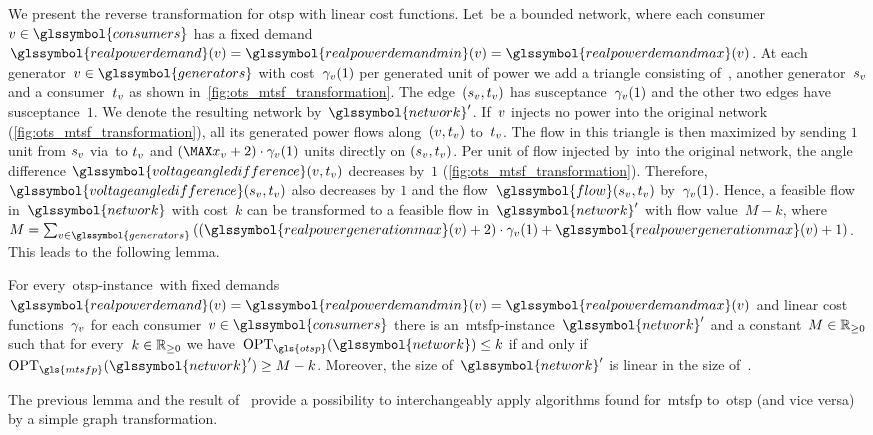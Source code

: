 We present the reverse transformation for
\gls{otsp} with linear cost functions. Let~\dcnetworktuple be a bounded
network, where each consumer~$\vertex\in\glssymbol{consumers}$ has a fixed
demand~$\glssymbol{realpowerdemand}(\vertex) =
\glssymbol{realpowerdemandmin}(\vertex) =
\glssymbol{realpowerdemandmax}(\vertex)$. At each
generator~$\vertex\in\glssymbol{generators}$ with cost~$\gamma_{v}(1)$ per
generated unit of power we add a triangle consisting of~\vertex, another
generator~$s_{v}$ and a consumer~$t_{v}$ as shown
in~\cref{fig:ots_mtsf_transformation}. The
edge~$(s_v,t_v)$ has susceptance~$\gamma_{v}(1)$ and
the other two edges have susceptance~$1$. We denote the resulting network
by~$\glssymbol{network}'$.
%
If~$v$ injects no power into the original network
(\cref{fig:ots_mtsf_transformation}), all its generated power flows
along~$(v, t_v)$ to~$t_v$. The flow in this triangle
is then maximized by sending $1$ unit from $s_{v}$ via~\vertex to
$t_v$ and $(\maxexcess_\vertex+2)\cdot\cost_{\vertex}(1)$ units
directly on $(s_v, t_v)$. Per unit of flow injected
by~\vertex into the original network, the angle difference
$\glssymbol{voltageangledifference}(\vertex, \sink_{\vertex})$ decreases by~$1$
(\cref{fig:ots_mtsf_transformation}). Therefore,
$\glssymbol{voltageangledifference}(\source_\vertex, \sink_\vertex)$ also
decreases by $1$ and the flow~$\glssymbol{flow}(\source_\vertex,
\sink_{\vertex})$ by~$\gamma_v(1)$. Hence, a feasible flow
in~$\glssymbol{network}$ with cost~$k$ can be transformed to a feasible flow
in~$\glssymbol{network}'$ with flow value~$M-k$, where~$
M
=
\sum_{\vertex\in\glssymbol{generators}}
\left((\glssymbol{realpowergenerationmax}(\vertex)+2)\cdot\cost_\vertex(1)
+
\glssymbol{realpowergenerationmax}(\vertex) + 1\right)
% 
$. This leads to the following lemma.
% 
\begin{lemma}
    \label{lem:ots_msf_transformation}
    For every~\gls{otsp}-instance~\dcnetworktuple with fixed
    demands~$\glssymbol{realpowerdemand}(\vertex) =
    \glssymbol{realpowerdemandmin}(\vertex) =
    \glssymbol{realpowerdemandmax}(\vertex)$ and linear cost
    functions~$\gamma_{v}$ for each
    consumer~$\vertex\in\glssymbol{consumers}$ there is
    an~\gls{mtsfp}-instance~$\glssymbol{network}'$ and a
    constant~$M\in\mathbb{R}_{\ge0}$ such that for every~$k\in\mathbb{R}_{\ge0}$ we
    have~$\opt_{\gls{otsp}}(\glssymbol{network})\le k$ if and only
    if~$\opt_{\gls{mtsfp}}(\glssymbol{network}')\ge M-k$. Moreover, the size
    of~$\glssymbol{network}'$ is linear in the size of~.
% 
\end{lemma}
% 
The previous lemma and the result of~\textcite[Lemma 2]{Leh14} provide a
possibility to interchangeably apply algorithms found for~\gls{mtsfp}
to~\gls{otsp} (and vice versa) by a simple graph transformation.

